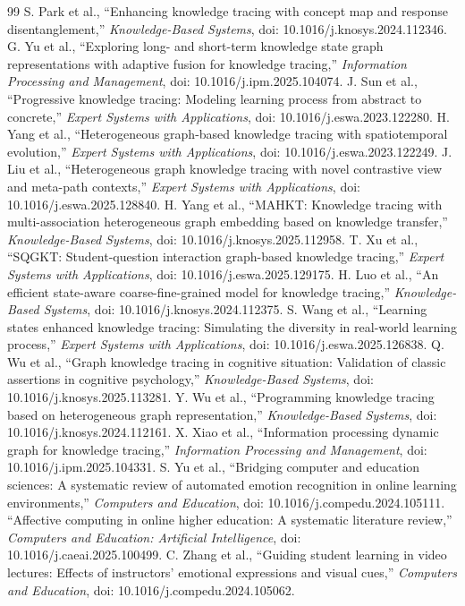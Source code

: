 \begin{thebibliography}{99}
 S. Park et al., ``Enhancing knowledge tracing with concept map and response disentanglement,'' \emph{Knowledge-Based Systems}, doi: 10.1016/j.knosys.2024.112346.
 G. Yu et al., ``Exploring long- and short-term knowledge state graph representations with adaptive fusion for knowledge tracing,'' \emph{Information Processing and Management}, doi: 10.1016/j.ipm.2025.104074.
 J. Sun et al., ``Progressive knowledge tracing: Modeling learning process from abstract to concrete,'' \emph{Expert Systems with Applications}, doi: 10.1016/j.eswa.2023.122280.
 H. Yang et al., ``Heterogeneous graph-based knowledge tracing with spatiotemporal evolution,'' \emph{Expert Systems with Applications}, doi: 10.1016/j.eswa.2023.122249.
 J. Liu et al., ``Heterogeneous graph knowledge tracing with novel contrastive view and meta-path contexts,'' \emph{Expert Systems with Applications}, doi: 10.1016/j.eswa.2025.128840.
 H. Yang et al., ``MAHKT: Knowledge tracing with multi-association heterogeneous graph embedding based on knowledge transfer,'' \emph{Knowledge-Based Systems}, doi: 10.1016/j.knosys.2025.112958.
 T. Xu et al., ``SQGKT: Student-question interaction graph-based knowledge tracing,'' \emph{Expert Systems with Applications}, doi: 10.1016/j.eswa.2025.129175.
 H. Luo et al., ``An efficient state-aware coarse-fine-grained model for knowledge tracing,'' \emph{Knowledge-Based Systems}, doi: 10.1016/j.knosys.2024.112375.
 S. Wang et al., ``Learning states enhanced knowledge tracing: Simulating the diversity in real-world learning process,'' \emph{Expert Systems with Applications}, doi: 10.1016/j.eswa.2025.126838.
 Q. Wu et al., ``Graph knowledge tracing in cognitive situation: Validation of classic assertions in cognitive psychology,'' \emph{Knowledge-Based Systems}, doi: 10.1016/j.knosys.2025.113281.
 Y. Wu et al., ``Programming knowledge tracing based on heterogeneous graph representation,'' \emph{Knowledge-Based Systems}, doi: 10.1016/j.knosys.2024.112161.
 X. Xiao et al., ``Information processing dynamic graph for knowledge tracing,'' \emph{Information Processing and Management}, doi: 10.1016/j.ipm.2025.104331.
 S. Yu et al., ``Bridging computer and education sciences: A systematic review of automated emotion recognition in online learning environments,'' \emph{Computers and Education}, doi: 10.1016/j.compedu.2024.105111.
 ``Affective computing in online higher education: A systematic literature review,'' \emph{Computers and Education: Artificial Intelligence}, doi: 10.1016/j.caeai.2025.100499.
 C. Zhang et al., ``Guiding student learning in video lectures: Effects of instructors' emotional expressions and visual cues,'' \emph{Computers and Education}, doi: 10.1016/j.compedu.2024.105062.
\end{thebibliography}
